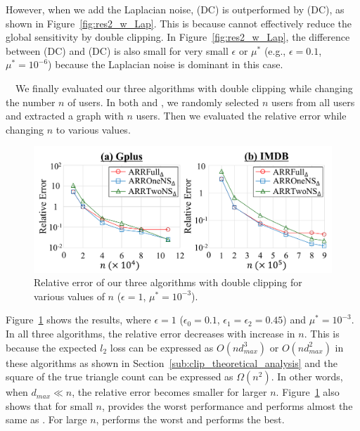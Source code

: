 However, when we add the Laplacian noise, \AlgThree{} (DC) is outperformed by \AlgTwo{} (DC), as shown in Figure~\ref{fig:res2_w_Lap}. 
This is because \AlgThree{} cannot effectively reduce the global sensitivity by double clipping. 
In Figure~\ref{fig:res2_w_Lap}, the difference between \AlgTwo{} (DC) and \AlgOne{} (DC) is also small for very small $\epsilon$ or $\mu^*$ (e.g., $\epsilon=0.1$, $\mu^*=10^{-6}$) because the Laplacian noise is dominant in this case. 

\smallskip
{}~~We 
finally 
evaluated our three algorithms with double clipping while changing the number $n$ of users. 
In both \GPlus{} and \IMDB{}, we randomly selected $n$ users from all users and extracted a graph with $n$ users. 
Then we evaluated the relative error while changing $n$ to various values.

\begin{figure}[t]
  \centering
  \includegraphics[width=0.99\linewidth]{fig/res3_n.pdf}
  \vspace{-4mm}
  \caption{Relative error of our three algorithms with double clipping for various values of $n$ 
  ($\epsilon=1$, $\mu^*=10^{-3}$).} 
  \label{fig:res3_n}
\end{figure}

Figure~\ref{fig:res3_n} shows the results, where $\epsilon=1$ ($\epsilon_0=0.1$, $\epsilon_1 = \epsilon_2 = 0.45$) and $\mu^* = 10^{-3}$. 
In all 
three algorithms, the relative error decreases with increase in $n$.
This is because the expected $l_2$ loss can be expressed as 
$O(n d_{max}^3)$ or $O(n d_{max}^2)$ 
in these algorithms as shown in Section~\ref{sub:clip_theoretical_analysis} and the square of the true triangle count can be expressed as $\Omega(n^2)$.
In other words, when $d_{max} \ll n$, the relative error becomes smaller for larger $n$. 
Figure~\ref{fig:res3_n} also shows that for small $n$, \AlgThree{} provides the worst performance and 
\AlgTwo{} performs almost the same as \AlgOne{}. 
For large $n$, 
\AlgOne{} performs the worst and 
\AlgTwo{} performs the best. 


